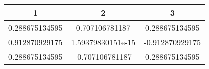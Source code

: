 \begin{tabular}{c|c|c} 
1 & 2 & 3 \\ 
\hline\hline
0.288675134595 & 0.707106781187 & 0.288675134595\\ 
\hline
0.912870929175 & 1.59379830151e-15 & -0.912870929175\\ 
\hline
0.288675134595 & -0.707106781187 & 0.288675134595\\ 
\hline
\end{tabular}